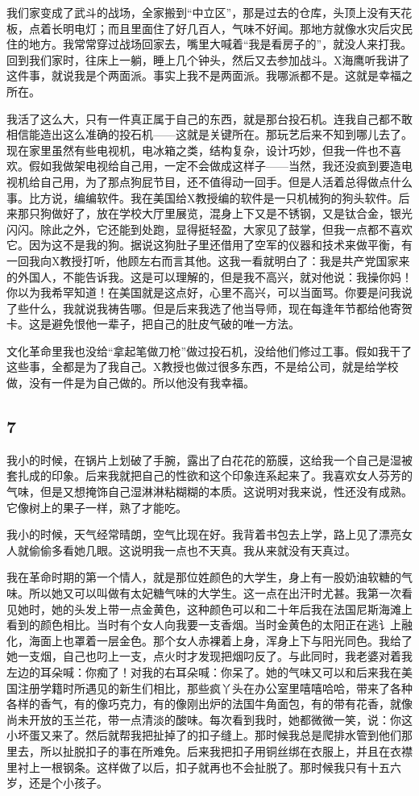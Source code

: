 我们家变成了武斗的战场，全家搬到“中立区”，那是过去的仓库，头顶上没有天花板，点着长明电灯；而且里面住了好几百人，气味不好闻。那地方就像水灾后灾民住的地方。我常常穿过战场回家去，嘴里大喊着“我是看房子的”，就没人来打我。回到我们家时，往床上一躺，睡上几个钟头，然后又去参加战斗。X海鹰听我讲了这件事，就说我是个两面派。事实上我不是两面派。我哪派都不是。这就是幸福之所在。 

我活了这么大，只有一件真正属于自己的东西，就是那台投石机。连我自己都不敢相信能造出这么准确的投石机——这就是关键所在。那玩艺后来不知到哪儿去了。现在家里虽然有些电视机，电冰箱之类，结构复杂，设计巧妙，但我一件也不喜欢。假如我做架电视给自己用，一定不会做成这样子——当然，我还没疯到要造电视机给自己用，为了那点狗屁节目，还不值得动一回手。但是人活着总得做点什么事。比方说，编编软件。我在美国给X教授编的软件是一只机械狗的狗头软件。后来那只狗做好了，放在学校大厅里展览，混身上下又是不锈钢，又是钛合金，银光闪闪。除此之外，它还能到处跑，显得挺轻盈，大家见了鼓掌，但我一点都不喜欢它。因为这不是我的狗。据说这狗肚子里还借用了空军的仪器和技术来做平衡，有一回我向X教授打听，他顾左右而言其他。这我一看就明白了：我是共产党国家来的外国人，不能告诉我。这是可以理解的，但是我不高兴，就对他说：我操你妈！你以为我希罕知道！在美国就是这点好，心里不高兴，可以当面骂。你要是问我说了些什么，我就说我祷告哪。但是后来我选了他当导师，现在每逢年节都给他寄贺卡。这是避免恨他一辈子，把自己的肚皮气破的唯一方法。 

文化革命里我也没给“拿起笔做刀枪”做过投石机，没给他们修过工事。假如我干了这些事，全都是为了我自己。X教授也做过很多东西，不是给公司，就是给学校做，没有一件是为自己做的。所以他没有我幸福。 

\subsection{7} 

我小的时候，在锅片上划破了手腕，露出了白花花的筋膜，这给我一个自己是湿被套扎成的印象。后来我就把自己的性欲和这个印象连系起来了。我喜欢女人芬芳的气味，但是又想掩饰自己湿淋淋粘糊糊的本质。这说明对我来说，性还没有成熟。它像树上的果子一样，熟了才能吃。 

我小的时候，天气经常晴朗，空气比现在好。我背着书包去上学，路上见了漂亮女人就偷偷多看她几眼。这说明我一点也不天真。我从来就没有天真过。 

我在革命时期的第一个情人，就是那位姓颜色的大学生，身上有一股奶油软糖的气味。所以她又可以叫做有太妃糖气味的大学生。这一点在出汗时尤甚。我第一次看见她时，她的头发上带一点金黄色，这种颜色可以和二十年后我在法国尼斯海滩上看到的颜色相比。当时有个女人向我要一支香烟。当时金黄色的太阳正在逃讠上融化，海面上也罩着一层金色。那个女人赤裸着上身，浑身上下与阳光同色。我给了她一支烟，自己也叼上一支，点火时才发现把烟叼反了。与此同时，我老婆对着我左边的耳朵喊：你痴了！对我的右耳朵喊：你呆了。她的气味又可以和后来我在美国注册学籍时所遇见的新生们相比，那些疯丫头在办公室里嘻嘻哈哈，带来了各种各样的香气，有的像巧克力，有的像刚出炉的法国牛角面包，有的带有花香，就像尚未开放的玉兰花，带一点清淡的酸味。每次看到我时，她都微微一笑，说：你这小坏蛋又来了。然后就帮我把扯掉了的扣子缝上。那时候我总是爬排水管到他们那里去，所以扯脱扣子的事在所难免。后来我把扣子用铜丝绑在衣服上，并且在衣襟里衬上一根钢条。这样做了以后，扣子就再也不会扯脱了。那时候我只有十五六岁，还是个小孩子。 

